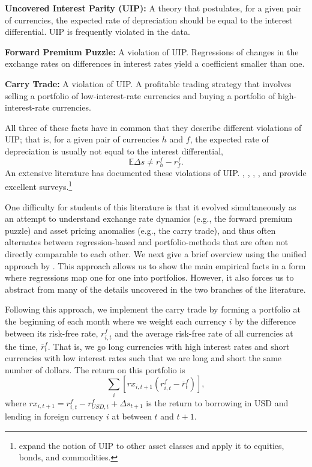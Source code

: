 \documentclass[11pt]{article}
\begin{document}
\begin{tcolorbox}[sharp corners, title = Definitions]
{\bf Uncovered Interest Parity (UIP):} A theory that postulates, for a given pair of currencies, the expected rate of depreciation should be equal to the interest differential. UIP is frequently violated in the data.

\vspace{1em}
{\bf Forward Premium Puzzle:} A violation of UIP. Regressions of changes in the exchange rates on differences in interest rates yield a coefficient smaller than one.

\vspace{1em}
{\bf Carry Trade:} A violation of UIP. A profitable trading strategy that involves selling a portfolio of low-interest-rate currencies and buying a portfolio of high-interest-rate currencies. 
\end{tcolorbox}
\noindent All three of these facts have in common that they describe different violations of UIP; that is, for a given pair of currencies $h$ and $f$, the expected rate of depreciation is usually not equal to the interest differential, $$\mathbb{E}\Delta s \neq r^f_h-r^f_f.$$ An extensive literature has documented these violations of UIP. \citet{Hodrick1987}, \citet{FrootThaler1990}, \citet{Engel1996}, \citet{Lewis2011}, and \citet{Engel2014} provide excellent surveys.\footnote{\cite{Koijen2018Carry} expand the notion of UIP to other asset classes and apply it to equities, bonds, and commodities.}

One difficulty for students of this literature is that it evolved simultaneously as an attempt to understand exchange rate dynamics (e.g., the forward premium puzzle) and asset pricing anomalies (e.g., the carry trade), and thus often alternates between regression-based and portfolio-methods that are often not directly comparable to each other. We next give a brief overview using the unified approach by \citet{HassanMano2019}. This approach allows us to show the main empirical facts in a form where regressions map one for one into portfolios. However, it also forces us to abstract from many of the details uncovered in the two branches of the literature.

Following this approach, we implement the carry trade by forming a portfolio at the beginning of each month where we weight each currency $i$ by the difference between its risk-free rate, $r^f_{i, t}$ and the average risk-free rate of all currencies at the time, $\overline{r}^f_t$. That is, we go long currencies with high interest rates and short currencies with low interest rates such that we are long and short the same number of dollars. The return on this portfolio is
\begin{equation}
  \label{eq_carry}
  \textstyle\sum_{i}\left[ rx_{i, t+1}\left( r^f_{i, t}-\overline{r}^f_{t}\right) \right] ,
\end{equation}%
where $rx_{i, t+1} = r^f_{i, t} - r^f_{USD, t} + \Delta s_{t + 1}$ is the return to borrowing in USD and lending in foreign currency $i$ at between $t$ and $t+1$.
\end{document}
